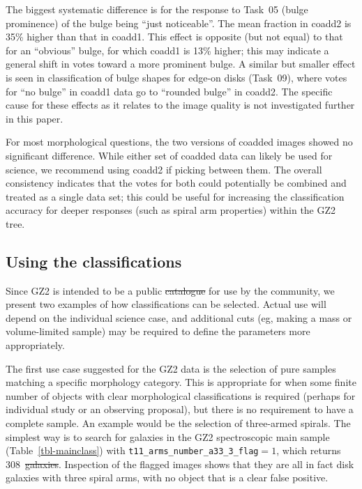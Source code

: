 \documentclass[useAMS,usenatbib]{mn2e}
\providecommand{\DIFaddtex}[1]{{\protect\color{blue}\uwave{#1}}} %
\providecommand{\DIFdeltex}[1]{{\protect\color{red}\sout{#1}}}                      %
\providecommand{\DIFaddbegin}{} %
\providecommand{\DIFaddend}{} %
\providecommand{\DIFdelbegin}{} %
\providecommand{\DIFdelend}{} %
\providecommand{\DIFadd}[1]{\texorpdfstring{\DIFaddtex{#1}}{#1}} %
\providecommand{\DIFdel}[1]{\texorpdfstring{\DIFdeltex{#1}}{}} %
\begin{document}
The biggest systematic difference is for the response to Task~05 (bulge prominence) of the bulge being ``just noticeable''. The mean fraction in coadd2 is 35\% higher than that in coadd1. This effect is opposite (but not equal) to that for an ``obvious'' bulge, for which coadd1 is 13\% higher; this may indicate a general shift in votes toward a more prominent bulge. A similar but smaller effect is seen in classification of bulge shapes for edge-on disks (Task~09), where votes for ``no bulge'' in coadd1 data go to ``rounded bulge'' in coadd2. The specific cause for these effects as it relates to the image quality is not investigated further in this paper. 

For most morphological questions, the two versions of coadded images showed no significant difference. While either set of coadded data can likely be used for science, we recommend using coadd2 if picking between them. The overall consistency indicates that the votes for both could potentially be combined and treated as a single data set; this could be useful for increasing the classification accuracy for deeper responses (such as spiral arm properties) within the GZ2 tree.

\subsection{Using the classifications}\label{ssec-usingdata}

Since GZ2 is intended to be a public \DIFdelbegin \DIFdel{catalogue }\DIFdelend \DIFaddbegin \DIFadd{catalog }\DIFaddend for use by the community, we present two examples of how classifications can be selected. Actual use will depend on the individual science case, and additional cuts (eg, making a mass or volume-limited sample) may be required to define the parameters more appropriately.

The first use case suggested for the GZ2 data is the selection of pure samples matching a specific morphology category. This is appropriate for when some finite number of objects with clear morphological classifications is required (perhaps for individual study or an observing proposal), but there is no requirement to have a complete sample. An example would be the selection of three-armed spirals. The simplest way is to search for galaxies in the GZ2 spectroscopic main sample (Table~\ref{tbl-mainclass}) with {\tt t11\_arms\_number\_a33\_3\_flag}$ = 1$, which returns 308~\DIFdelbegin \DIFdel{galaxies}\DIFdelend \DIFaddbegin \DIFadd{examples}\DIFaddend . Inspection of the flagged images shows that they are all in fact disk galaxies with three spiral arms, with no object that is a clear false positive. 
\end{document}
